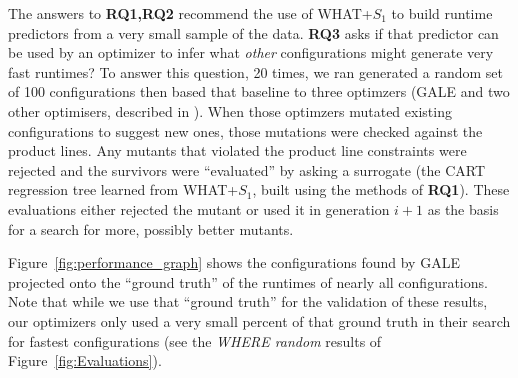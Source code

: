 \documentclass{sig-alternative}
\newcommand{\fig}[1]{Figure~\ref{fig:#1}}
\begin{document}
The answers to {\bf RQ1,RQ2} recommend the use of WHAT+$S_1$ to build runtime predictors from a very small sample
of the data. {\bf RQ3}
asks if that predictor can be used by an optimizer to infer what {\em other} configurations might generate very fast runtimes?
To answer this question, 20 times, we ran generated a random set of 100 configurations then based that baseline to three optimzers
(GALE and two other optimisers,  described in ). When those optimzers mutated existing configurations to suggest new ones,
those mutations were checked against the product lines. Any mutants that violated the product line constraints were rejected
and the survivors were ``evaluated'' by asking a surrogate
(the  CART regression tree learned from WHAT+$S_1$, built using the methods of {\bf RQ1}).
These evaluations either rejected the mutant or used it in generation $i+1$ as the basis for a search for more, possibly
better  mutants.

\fig{performance_graph} shows the configurations found by GALE projected onto the ``ground truth'' of the runtimes of nearly
all configurations. Note that while we use that ``ground truth'' for the validation of these results, our optimizers only
used a very small percent of that ground truth in their search for fastest configurations (see the {\em WHERE random}
results of \fig{Evaluations}).
\end{document}
